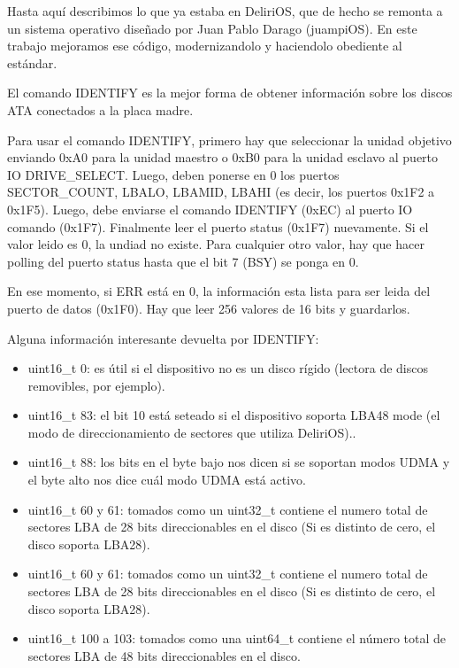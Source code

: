 Hasta aquí describimos lo que ya estaba en DeliriOS, que de hecho se remonta a un sistema operativo diseñado por Juan Pablo Darago (juampiOS). En este trabajo mejoramos ese código, modernizandolo y haciendolo obediente al estándar.

El comando IDENTIFY es la mejor forma de obtener información sobre los discos ATA conectados a la placa madre.

Para usar el comando IDENTIFY, primero hay que seleccionar la unidad objetivo enviando 0xA0 para la unidad maestro o 0xB0  para la unidad esclavo al puerto IO DRIVE\_SELECT. Luego, deben ponerse en 0 los puertos SECTOR\_COUNT, LBALO, LBAMID, LBAHI (es decir, los puertos 0x1F2 a 0x1F5). Luego, debe enviarse el comando IDENTIFY (0xEC) al puerto IO comando (0x1F7). Finalmente leer el puerto status (0x1F7) nuevamente. Si el valor leido es 0, la undiad no existe. Para cualquier otro valor, hay que hacer polling del puerto status hasta que el bit 7 (BSY) se ponga en 0.

En ese momento, si ERR está en 0, la información esta lista para ser leida del puerto de datos (0x1F0). Hay que leer 256 valores de 16 bits y guardarlos.

Alguna información interesante devuelta por IDENTIFY:

\begin{itemize}
 \item uint16\_t 0: es útil si el dispositivo no es un disco rígido (lectora de discos removibles, por ejemplo).
 \item uint16\_t 83: el bit 10 está seteado si el dispositivo soporta LBA48 mode (el modo de direccionamiento de sectores que utiliza DeliriOS)..
 \item uint16\_t 88: los bits en el byte bajo nos dicen si se soportan modos UDMA y el byte alto nos dice cuál modo UDMA está activo. 
 \item uint16\_t 60 y 61: tomados como un uint32\_t contiene el numero total de  sectores LBA de 28 bits direccionables en el disco (Si es distinto de cero, el disco soporta LBA28).
 \item uint16\_t 60 y 61: tomados como un uint32\_t contiene el numero total de  sectores LBA de 28 bits direccionables en el disco (Si es distinto de cero, el disco soporta LBA28).
 \item uint16\_t 100 a 103: tomados como una uint64\_t contiene el número total de sectores LBA de 48 bits direccionables en el disco.
\end{itemize}






